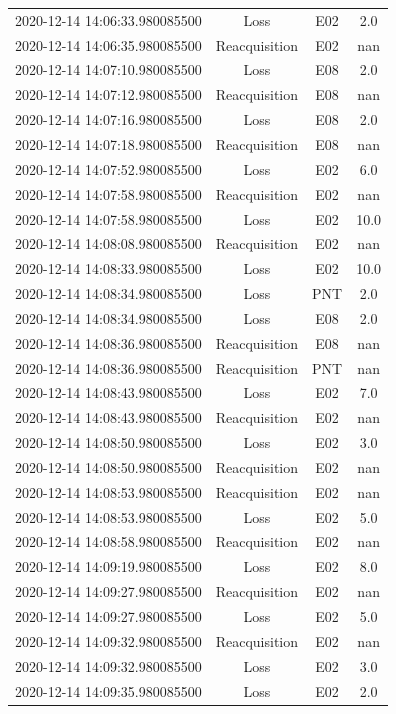 \begin{enumerate}
\begin{longtabu}{cccc}
2020{-}12{-}14 14:06:33.980085500&Loss&E02&2.0\\%
2020{-}12{-}14 14:06:35.980085500&Reacquisition&E02&nan\\%
2020{-}12{-}14 14:07:10.980085500&Loss&E08&2.0\\%
2020{-}12{-}14 14:07:12.980085500&Reacquisition&E08&nan\\%
2020{-}12{-}14 14:07:16.980085500&Loss&E08&2.0\\%
2020{-}12{-}14 14:07:18.980085500&Reacquisition&E08&nan\\%
2020{-}12{-}14 14:07:52.980085500&Loss&E02&6.0\\%
2020{-}12{-}14 14:07:58.980085500&Reacquisition&E02&nan\\%
2020{-}12{-}14 14:07:58.980085500&Loss&E02&10.0\\%
2020{-}12{-}14 14:08:08.980085500&Reacquisition&E02&nan\\%
2020{-}12{-}14 14:08:33.980085500&Loss&E02&10.0\\%
2020{-}12{-}14 14:08:34.980085500&Loss&PNT&2.0\\%
2020{-}12{-}14 14:08:34.980085500&Loss&E08&2.0\\%
2020{-}12{-}14 14:08:36.980085500&Reacquisition&E08&nan\\%
2020{-}12{-}14 14:08:36.980085500&Reacquisition&PNT&nan\\%
2020{-}12{-}14 14:08:43.980085500&Loss&E02&7.0\\%
2020{-}12{-}14 14:08:43.980085500&Reacquisition&E02&nan\\%
2020{-}12{-}14 14:08:50.980085500&Loss&E02&3.0\\%
2020{-}12{-}14 14:08:50.980085500&Reacquisition&E02&nan\\%
2020{-}12{-}14 14:08:53.980085500&Reacquisition&E02&nan\\%
2020{-}12{-}14 14:08:53.980085500&Loss&E02&5.0\\%
2020{-}12{-}14 14:08:58.980085500&Reacquisition&E02&nan\\%
2020{-}12{-}14 14:09:19.980085500&Loss&E02&8.0\\%
2020{-}12{-}14 14:09:27.980085500&Reacquisition&E02&nan\\%
2020{-}12{-}14 14:09:27.980085500&Loss&E02&5.0\\%
2020{-}12{-}14 14:09:32.980085500&Reacquisition&E02&nan\\%
2020{-}12{-}14 14:09:32.980085500&Loss&E02&3.0\\%
2020{-}12{-}14 14:09:35.980085500&Loss&E02&2.0\\%

\end{longtabu}
\end{enumerate}
